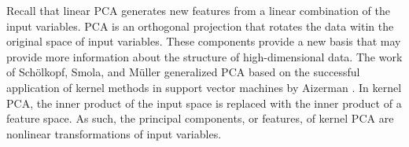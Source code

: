 Recall that linear PCA generates new features from a linear combination of the input variables.
PCA is an orthogonal projection that rotates the data witin the original space of input variables.
These components provide a new basis that may provide more information about the structure of high-dimensional data.
The work of Sch\"olkopf, Smola, and M\"uller \cite{scholkopf1998nonlinear} generalized PCA based on the successful application of kernel methods in support vector machines by Aizerman \cite{aizerman1964theoretical}.
In kernel PCA, the inner product of the input space is replaced with the inner product of a feature space.
As such, the principal components, or features, of kernel PCA are nonlinear transformations of input variables.

